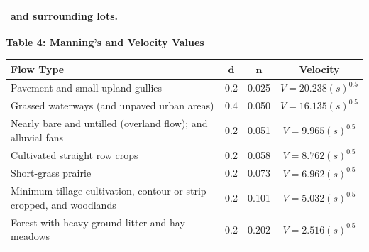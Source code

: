 \documentclass{article}
\begin{document}
\begin{center}
\begin{tabular}{|l|lll|}
    and surrounding lots.                     &                      &  &                                           \\\hline
\end{tabular}
\newpage 
{\large{\bf Table 4: Manning's and Velocity Values\\}}
\vspace{3mm}
\begin{tabular}{|l c c c|}
    \hline
    \textbf{Flow Type} & \textbf{$\bm{d}$} & \textbf{$\bm{n}$} & \textbf{Velocity}\\\hline
    Pavement and small upland gullies & 0.2 & 0.025 & $V=20.238(s)^{0.5}$\\
    Grassed waterways (and unpaved urban areas) & 0.4 & 0.050 & $V=16.135(s)^{0.5}$\\
    Nearly bare and untilled (overland flow); and alluvial fans & 0.2 & 0.051 & $V=9.965(s)^{0.5}$\\
    Cultivated straight row crops & 0.2 & 0.058 & $V=8.762(s)^{0.5}$\\
    Short-grass prairie & 0.2 & 0.073 & $V=6.962(s)^{0.5}$\\
    Minimum tillage cultivation, contour or strip-cropped, and woodlands & 0.2 & 0.101 & $V=5.032(s)^{0.5}$\\
    Forest with heavy ground litter and hay meadows & 0.2 & 0.202  &$V=2.516(s)^{0.5}$ \\\hline
\end{tabular}
\end{center}
\end{document}
